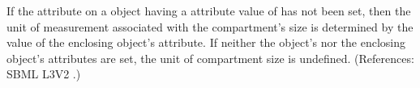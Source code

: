 If the attribute  on a \Compartment object having a
 attribute value of  has not been set, then
the unit of measurement associated with the compartment's size is
determined by the value of the enclosing \Model object's 
attribute.  If neither the \Compartment object's  nor the
enclosing \Model object's  attributes are set, the unit of
compartment size is undefined.  (References: SBML L3V2
.)
